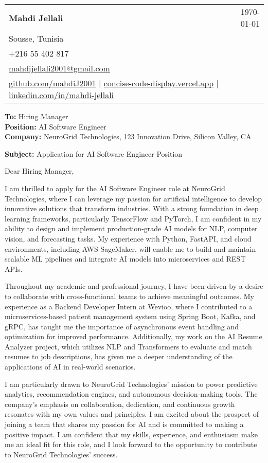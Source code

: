 \documentclass[letterpaper,11pt]{article}
\makeatletter
\newcommand{\letterHeading}[5]{
    \begin{tabular*}{\textwidth}{l@{\extracolsep{\fill}}r}
    \textbf{\Large #1} & #5 \\  %
    #2 & \\
    #3 & \\
    #4 & \\
    \end{tabular*}
    \vspace{15pt}
}
\newcommand{\letterRecipient}[3]{
    \textbf{\large To:} #1 \\
    \textbf{\large Position:} #2 \\
    \textbf{\large Company:} #3 \\
    \vspace{12pt}
}
\newcommand{\letterSubject}[1]{
    \textbf{\large Subject:} #1 \\
    \vspace{15pt}
}
\makeatother
\begin{document}
    \letterHeading
    {Mahdi Jellali}
    {Sousse, Tunisia}
    {+216 55 402 817 \\ \href{mailto:mahdijellali2001@gmail.com}{mahdijellali2001@gmail.com}}
    {\href{https://github.com/mahdiJ2001}{github.com/mahdiJ2001} $|$ \href{https://concise-code-display.vercel.app/}{concise-code-display.vercel.app} $|$ \href{https://www.linkedin.com/in/mahdi-jellali/}{linkedin.com/in/mahdi-jellali}}
    {\today}

    \letterRecipient
    {Hiring Manager}
    {AI Software Engineer}
    {NeuroGrid Technologies, 123 Innovation Drive, Silicon Valley, CA}

    \letterSubject{Application for AI Software Engineer Position}

    Dear Hiring Manager,

    I am thrilled to apply for the AI Software Engineer role at NeuroGrid Technologies, where I can leverage my passion for artificial intelligence to develop innovative solutions that transform industries. With a strong foundation in deep learning frameworks, particularly TensorFlow and PyTorch, I am confident in my ability to design and implement production-grade AI models for NLP, computer vision, and forecasting tasks. My experience with Python, FastAPI, and cloud environments, including AWS SageMaker, will enable me to build and maintain scalable ML pipelines and integrate AI models into microservices and REST APIs.

    Throughout my academic and professional journey, I have been driven by a desire to collaborate with cross-functional teams to achieve meaningful outcomes. My experience as a Backend Developer Intern at Wevioo, where I contributed to a microservices-based patient management system using Spring Boot, Kafka, and gRPC, has taught me the importance of asynchronous event handling and optimization for improved performance. Additionally, my work on the AI Resume Analyzer project, which utilizes NLP and Transformers to evaluate and match resumes to job descriptions, has given me a deeper understanding of the applications of AI in real-world scenarios.

    I am particularly drawn to NeuroGrid Technologies' mission to power predictive analytics, recommendation engines, and autonomous decision-making tools. The company's emphasis on collaboration, dedication, and continuous growth resonates with my own values and principles. I am excited about the prospect of joining a team that shares my passion for AI and is committed to making a positive impact. I am confident that my skills, experience, and enthusiasm make me an ideal fit for this role, and I look forward to the opportunity to contribute to NeuroGrid Technologies' success.
\end{document}
